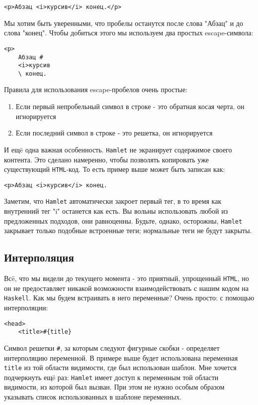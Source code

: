\begin{lstlisting}
<p>Абзац <i>курсив</i> конец.</p>
\end{lstlisting}

Мы хотим быть уверенными, что пробелы останутся после слова "Абзац" и до слова
"конец". Чтобы добиться этого мы используем два простых escape-символа:

\begin{lstlisting}
<p>
    Абзац #
    <i>курсив
    \ конец.
\end{lstlisting}

Правила для использования escape-пробелов очень простые:
\begin{enumerate}
    \item Если первый непробельный символ в строке - это обратная косая черта,
        он игнорируется
    \item Если последний символ в строке - это решетка, он игнорируется
\end{enumerate}

И ещë одна важная особенность. \texttt{Hamlet} не экранирует содержимое своего
контента.  Это сделано намеренно, чтобы позволять копировать уже существующий
\texttt{HTML}-код.  То есть пример выше может быть записан как:
\begin{lstlisting}
<p>Абзац <i>курсив</i> конец.
\end{lstlisting}

Заметим, что \texttt{Hamlet} автоматически закроет первый тег, в то время как
внутренний тег "i" останется как есть. Вы вольны использовать любой из
предложенных подходов, они равноценны. Будьте, однако, осторожны,
\texttt{Hamlet} закрывает только подобные встроенные теги; нормальные теги не
будут закрыты.

\subsection{Интерполяция}

Всë, что мы видели до текущего момента - это приятный, упрощенный
\texttt{HTML}, но он не предоставляет никакой возможности взаимодействовать с
нашим кодом на \texttt{Haskell}.  Как мы будем встраивать в него переменные?
Очень просто: с помощью интерполяции:
\begin{lstlisting}
<head>
    <title>#{title}
\end{lstlisting}

Символ решетки \verb'#', за которым следуют фигурные скобки - определяет
интерполяцию переменной. В примере выше будет использована переменная
\lstinline!title! из той области видимости, где был использован шаблон. Мне
хочется подчеркнуть ещë раз: \texttt{Hamlet} имеет доступ к переменным той
области видимости, из которой был вызван.  При этом не нужно особым образом
указывать список использованных в шаблоне переменных.


